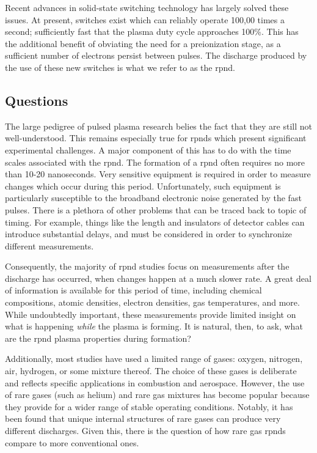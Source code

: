 Recent advances in solid-state switching technology has largely solved these
issues. At present, switches exist which can reliably operate 100,00 times a
second; sufficiently fast that the plasma duty cycle approaches 100\%. This has
the additional benefit of obviating the need for a preionization stage, as a
sufficient number of electrons persist between pulses. The discharge produced by
the use of these new switches is what we refer to as the \acs{rpnd}.

\subsection{Questions}

The large pedigree of pulsed plasma research belies the fact that they are still
not well-understood. This remains especially true for \acs{rpnd}s which present
significant experimental challenges. A major component of this has to do with
the time scales associated with the \acs{rpnd}. The formation of a \acs{rpnd}
often requires no more than 10-20 nanoseconds. Very sensitive equipment is
required in order to measure changes which occur during this period.
Unfortunately, such equipment is particularly susceptible to the broadband
electronic noise generated by the fast pulses. There is a plethora of other
problems that can be traced back to topic of timing. For example, things like
the length and insulators of detector cables can introduce substantial delays,
and must be considered in order to synchronize different measurements.

Consequently, the majority of \acs{rpnd} studies focus on measurements after the
discharge has occurred, when changes happen at a much slower rate. A great deal
of information is available for this period of time, including chemical
compositions, atomic densities, electron densities, gas temperatures, and more.
While undoubtedly important, these measurements provide limited insight on what
is happening \emph{while} the plasma is forming. It is natural, then, to ask,
what are the \acs{rpnd} plasma properties during formation?

Additionally, most studies have used a limited range of gases: oxygen, nitrogen,
air, hydrogen, or some mixture thereof. The choice of these gases is deliberate
and reflects specific applications in combustion and aerospace. However, the use
of rare gases (such as helium) and rare gas mixtures has become popular because
they provide for a wider range of stable operating conditions. Notably, it has
been found that unique internal structures of rare gases can produce very
different discharges. Given this, there is the question of how rare gas
\acs{rpnd}s compare to more conventional ones.

